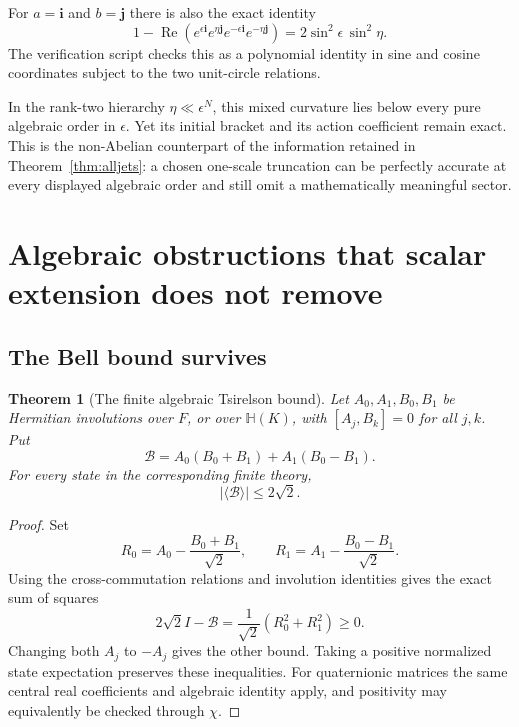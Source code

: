 \documentclass[11pt,oneside]{article}
\numberwithin{equation}{section}
\theoremstyle{plain}
\newtheorem{theorem}{Theorem}[section]
\theoremstyle{definition}
\theoremstyle{remark}
\newcommand{\HH}{\mathbb H}
\newcommand{\Rea}{\operatorname{Re}}
\newcommand{\abs}[1]{\left|#1\right|}
\begin{document}
For $a=\mathbf i$ and $b=\mathbf j$ there is also the exact identity
\begin{equation}\label{eq:exactplaquette}
 1-\Rea\left(e^{\epsilon\mathbf i}e^{\eta\mathbf j}
 e^{-\epsilon\mathbf i}e^{-\eta\mathbf j}\right)
 =2\sin^2\epsilon\,\sin^2\eta.
\end{equation}
The verification script checks this as a polynomial identity in sine and cosine coordinates subject to the two unit-circle relations.

In the rank-two hierarchy $\eta\ll\epsilon^N$, this mixed curvature lies below every pure algebraic order in $\epsilon$. Yet its initial bracket and its action coefficient remain exact. This is the non-Abelian counterpart of the information retained in Theorem~\ref{thm:alljets}: a chosen one-scale truncation can be perfectly accurate at every displayed algebraic order and still omit a mathematically meaningful sector.

\section{Algebraic obstructions that scalar extension does not remove}\label{sec:nogo}

\subsection{The Bell bound survives}
\begin{theorem}[The finite algebraic Tsirelson bound]\label{thm:bell}
Let $A_0,A_1,B_0,B_1$ be Hermitian involutions over $F$, or over $\HH(K)$, with $[A_j,B_k]=0$ for all $j,k$. Put
\[
 \mathcal B=A_0(B_0+B_1)+A_1(B_0-B_1).
\]
For every state in the corresponding finite theory,
\[
 \abs{\langle\mathcal B\rangle}\le2\sqrt2.
\]
\end{theorem}
\begin{proof}
Set
\[
 R_0=A_0-\frac{B_0+B_1}{\sqrt2},\qquad
 R_1=A_1-\frac{B_0-B_1}{\sqrt2}.
\]
Using the cross-commutation relations and involution identities gives the exact sum of squares
\begin{equation}\label{eq:BellSOS}
 2\sqrt2 I-\mathcal B=\frac1{\sqrt2}(R_0^2+R_1^2)\ge0.
\end{equation}
Changing both $A_j$ to $-A_j$ gives the other bound. Taking a positive normalized state expectation preserves these inequalities. For quaternionic matrices the same central real coefficients and algebraic identity apply, and positivity may equivalently be checked through $\chi$.
\end{proof}
\end{document}
